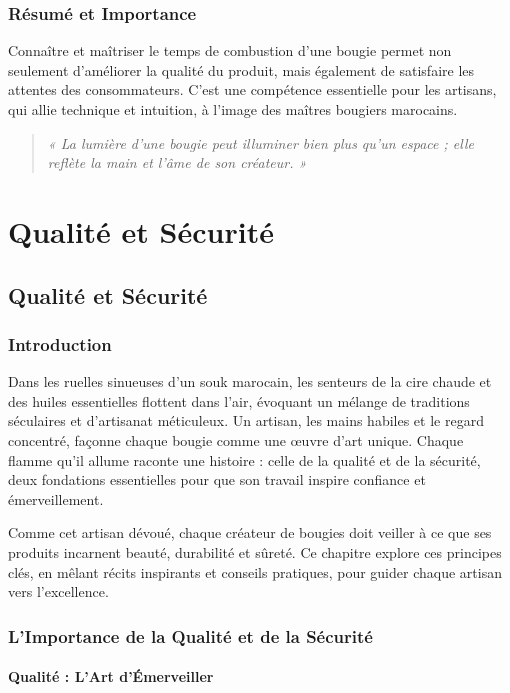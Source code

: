 \documentclass[11pt,fleqn,onecolumn,oneside]{book}
\begin{document}
\section{Résumé et Importance}

Connaître et maîtriser le temps de combustion d’une bougie permet non seulement d’améliorer la qualité du produit, mais également de satisfaire les attentes des consommateurs. C’est une compétence essentielle pour les artisans, qui allie technique et intuition, à l’image des maîtres bougiers marocains.

\begin{quote}
\textit{« La lumière d’une bougie peut illuminer bien plus qu’un espace ; elle reflète la main et l’âme de son créateur. »}
\end{quote}

\part{Qualité et Sécurité}
\chapter{Qualité et Sécurité}

\section{Introduction}

Dans les ruelles sinueuses d’un souk marocain, les senteurs de la cire chaude et des huiles essentielles flottent dans l’air, évoquant un mélange de traditions séculaires et d’artisanat méticuleux. Un artisan, les mains habiles et le regard concentré, façonne chaque bougie comme une œuvre d’art unique. Chaque flamme qu’il allume raconte une histoire : celle de la qualité et de la sécurité, deux fondations essentielles pour que son travail inspire confiance et émerveillement.

Comme cet artisan dévoué, chaque créateur de bougies doit veiller à ce que ses produits incarnent beauté, durabilité et sûreté. Ce chapitre explore ces principes clés, en mêlant récits inspirants et conseils pratiques, pour guider chaque artisan vers l’excellence.

\section{L’Importance de la Qualité et de la Sécurité}

\subsection*{Qualité : L’Art d’Émerveiller}
\end{document}
